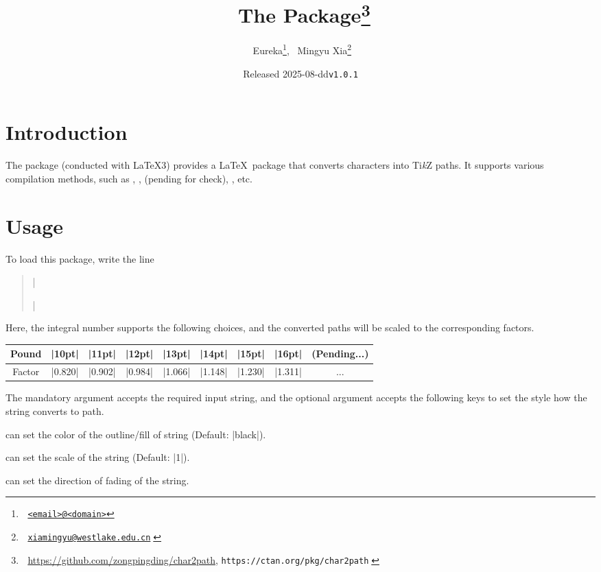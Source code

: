 \documentclass[lm-default]{l3doc}
\title{^^A
  The \pkg{char2path} Package\thanks{^^A
    \url{https://github.com/zongpingding/char2path},
    \texttt{https://ctan.org/pkg/char2path}^^A
  }^^A
}
\author{^^A
  Eureka\thanks{^^A
    \href{mailto:<email>@<domain>}{\texttt{<email>@<domain>}}},~
  Mingyu Xia\thanks{^^A
    \href{mailto:xiamingyu@westlake.edu.cn}{\texttt{xiamingyu@westlake.edu.cn}}^^A
  }^^A
}
\date{Released 2025-08-dd\quad \texttt{v1.0.1}}
\begin{document}
\maketitle

\begin{documentation}

\section{Introduction}

The  package (conducted with \LaTeX3) provides
a \LaTeX\ package that converts characters into Ti\textit k\/Z paths.
It supports various compilation methods, such as ,
,  (pending for check), , etc.

\section{Usage}

To load this package, write the line
\begin{quote}
  |\usepackage[scale = ||pt]{char2path}|
\end{quote}

Here, the integral number  supports the following choices,
and the converted paths will be scaled to the corresponding factors.

\begin{center}
  \begin{tabular}{*9c}
    \toprule
    Pound   & |10pt|  & |11pt|  & |12pt|  &
    |13pt|  & |14pt|  & |15pt|  & |16pt|  & (Pending...)\\
    \midrule
    Factor  & |0.820| & |0.902| & |0.984| &
    |1.066| & |1.148| & |1.230| & |1.311| & ...\\
    \bottomrule
  \end{tabular}
\end{center}

\begin{function}{\chartopath}
  \begin{syntax}
      
  \end{syntax}
  The mandatory argument accepts the required input string, and the optional
  argument accepts the following keys to set the style how the string converts
  to path.
  \begin{keyval}
    \item [\key{draw,fill}]  can set the color of the outline/fill of string
    (Default: |black|).
    \item [\key{scale}]  can set the scale of the string
    (Default: |1|).
    \item [\key{path fading}]  can set the direction of
    fading of the string.
  \end{keyval}
\end{function}


\end{documentation}
\end{document}
